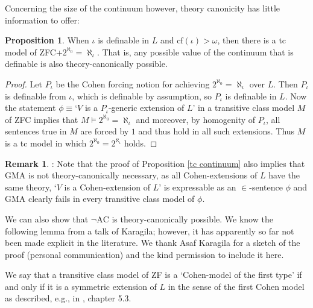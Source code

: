 \documentclass[a4paper,12pt]{amsart}
\theoremstyle{definition}
\newtheorem{prop}[fact]{Proposition}
\newtheorem{remark}[fact]{Remark}
\begin{document}
Concerning the size of the continuum however, theory canonicity has little information to offer:

\begin{prop}{\label{tc continuum}}
 When $\iota$ is definable in $L$ and $\text{cf}(\iota)>\omega$, then there is a tc model of ZFC+$2^{\aleph_{0}}=\aleph_{\iota}$. That is, any possible value of the continuum that is definable is also
 theory-canonically possible.
\end{prop}
\begin{proof}
 Let $P_{\iota}$ be the Cohen forcing notion for achieving $2^{\aleph_{0}}=\aleph_{\iota}$ over $L$. Then $P_{\iota}$ is definable from $\iota$, which is definable by assumption,
 so $P_{\iota}$ is definable in $L$. Now the statement $\phi\equiv$`$V$ is a $P_{\iota}$-generic extension of $L$' in a transitive class model $M$ of 
 ZFC implies that $M\models2^{\aleph_{0}}=\aleph_{\iota}$ and moreover, by homogenity of $P_{\iota}$, all sentences true in $M$ are forced by $1$ and thus hold in all such extensions. 
 Thus $M$ is a tc model in which $2^{\aleph_{0}}=2^{\aleph_{\iota}}$ holds.
\end{proof}


\begin{remark}: Note that the proof of Proposition \ref{tc continuum} also implies that GMA is not theory-canonically necessary, as all Cohen-extensions of $L$ have the same theory, `$V$ is a Cohen-extension of $L$'
is expressable as an $\in$-sentence $\phi$ and GMA clearly fails in every transitive class model of $\phi$.
\end{remark}



We can also show that $\neg\text{AC}$ is theory-canonically possible. 
We know the following lemma from a talk of Karagila; however, it has apparently so far not been made explicit in the literature. We thank Asaf Karagila for a sketch of the proof (personal communication) and the kind permission to include it here. 

We say that a transitive class model of ZF is a `Cohen-model of the first type' if and only if it is a symmetric extension of $L$ in the sense of the first Cohen model as described, e.g., in \cite{JechAC}, chapter 5.3. 
\end{document}
